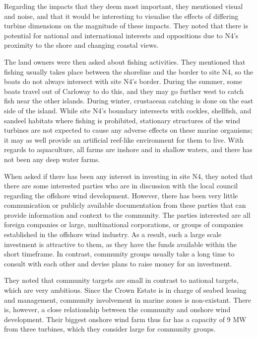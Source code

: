 Regarding the impacts that they deem most important, they mentioned visual and noise, and that it would be interesting to visualise the effects of differing turbine dimensions on the magnitude of these impacts. They noted that there is potential for national and international interests and oppositions due to N4's proximity to the shore and changing coastal views.

The land owners were then asked about fishing activities. They mentioned that fishing usually takes place between the shoreline and the border to site N4, so the boats do not always intersect with site N4's border. During the summer, some boats travel out of Carloway to do this, and they may go further west to catch fish near the other islands. During winter, crustacean catching is done on the east side of the island. While site N4's boundary intersects with cockles, shellfish, and sandeel habitats where fishing is prohibited, stationary structures of the wind turbines are not expected to cause any adverse effects on these marine organisms; it may as well provide an artificial reef-like environment for them to live. With regards to aquaculture, all farms are inshore and in shallow waters, and there has not been any deep water farms.

When asked if there has been any interest in investing in site N4, they noted that there are some interested parties who are in discussion with the local council regarding the offshore wind development. However, there has been very little communication or publicly available documentation from these parties that can provide information and context to the community. The parties interested are all foreign companies or large, multinational corporations, or groups of companies established in the offshore wind industry. As a result, such a large scale investment is attractive to them, as they have the funds available within the short timeframe. In contrast, community groups usually take a long time to consult with each other and devise plans to raise money for an investment.

They noted that community targets are small in contrast to national targets, which are very ambitious. Since the Crown Estate is in charge of seabed leasing and management, community involvement in marine zones is non-existant. There is, however, a close relationship between the community and onshore wind development. Their biggest onshore wind farm thus far has a capacity of 9 MW from three turbines, which they consider large for community groups.

